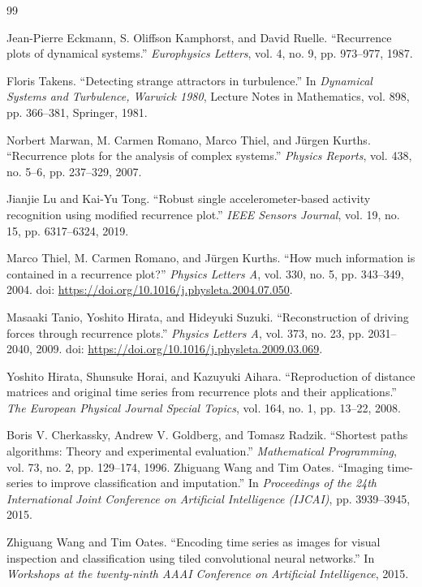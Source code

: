 \documentclass[10pt,a4paper,parskip=half-]{scrartcl}
\begin{document}
\begin{thebibliography}{99}

Jean-Pierre Eckmann, S. Oliffson Kamphorst, and David Ruelle. ``Recurrence plots of dynamical systems.'' \textit{Europhysics Letters}, vol. 4, no. 9, pp. 973--977, 1987.


Floris Takens. ``Detecting strange attractors in turbulence.'' In \textit{Dynamical Systems and Turbulence, Warwick 1980}, Lecture Notes in Mathematics, vol. 898, pp. 366--381, Springer, 1981.

Norbert Marwan, M. Carmen Romano, Marco Thiel, and Jürgen Kurths. ``Recurrence plots for the analysis of complex systems.'' \textit{Physics Reports}, vol. 438, no. 5--6, pp. 237--329, 2007.

Jianjie Lu and Kai-Yu Tong. “Robust single accelerometer-based activity recognition using modified recurrence plot.” \textit{IEEE Sensors Journal}, vol. 19, no. 15, pp. 6317–6324, 2019.

Marco Thiel, M. Carmen Romano, and Jürgen Kurths. “How much information is contained in a recurrence plot?” \textit{Physics Letters A}, vol. 330, no. 5, pp. 343–349, 2004. doi: \url{https://doi.org/10.1016/j.physleta.2004.07.050}.

Masaaki Tanio, Yoshito Hirata, and Hideyuki Suzuki. “Reconstruction of driving forces through recurrence plots.” \textit{Physics Letters A}, vol. 373, no. 23, pp. 2031–2040, 2009. doi: \url{https://doi.org/10.1016/j.physleta.2009.03.069}.

Yoshito Hirata, Shunsuke Horai, and Kazuyuki Aihara. “Reproduction of distance matrices and original time series from recurrence plots and their applications.” \textit{The European Physical Journal Special Topics}, vol. 164, no. 1, pp. 13–22, 2008.

Boris V. Cherkassky, Andrew V. Goldberg, and Tomasz Radzik. “Shortest paths algorithms: Theory and experimental evaluation.” \textit{Mathematical Programming}, vol. 73, no. 2, pp. 129–174, 1996.
Zhiguang Wang and Tim Oates. “Imaging time-series to improve classification and imputation.” In \textit{Proceedings of the 24th International Joint Conference on Artificial Intelligence (IJCAI)}, pp. 3939--3945, 2015.

Zhiguang Wang and Tim Oates. “Encoding time series as images for visual inspection and classification using tiled convolutional neural networks.” In \textit{Workshops at the twenty-ninth AAAI Conference on Artificial Intelligence}, 2015.


\end{thebibliography}
\end{document}
